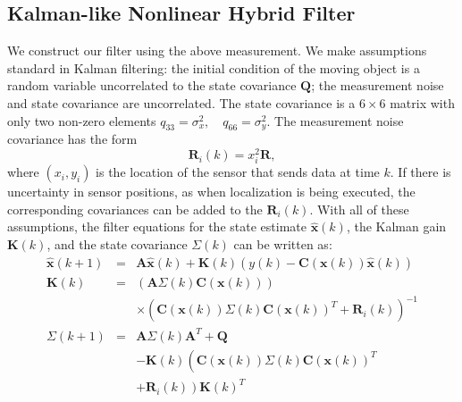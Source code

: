 \subsection{Kalman-like Nonlinear Hybrid Filter}
We construct our filter using the above measurement. We make assumptions standard in Kalman filtering: the initial condition of the moving object is a random variable uncorrelated to the state covariance $\mathbf{Q}$;  the measurement noise and state covariance are uncorrelated. The state covariance is a $6 \times 6$ matrix with only two non-zero elements $q_{33}=\sigma_x^2,\quad q_{66}=\sigma_y^2$. The measurement noise covariance has the form
\begin{equation}\label{eqn:Rk}
    \mathbf{R}_i(k)=x_i^2\mathbf{R},
\end{equation}
where $(x_i,y_i)$ is the location of the sensor that sends data at time $k$. If there is uncertainty in sensor positions, as when localization is being executed, the corresponding covariances can be added to the $\mathbf{R}_i(k)$. With all of these assumptions, the filter equations for the state estimate $\mathbf{\hat{x}}(k)$, the Kalman gain $\mathbf{K}(k)$, and the state covariance ${\Sigma}(k)$ can be written as:
 \begin{eqnarray}
   \mathbf{\hat{x}}(k+1) &=& \mathbf{A}\mathbf{\hat{x}}(k)+ \mathbf{K}(k)\left(y(k)-\mathbf{C}\left(\mathbf{x}(k)\right)\mathbf{\hat{x}}(k)\right)\label{eqn:Kalman-likeFilter}\\
   \mathbf{K}(k) &=& \left(\mathbf{A}{\Sigma}(k)\mathbf{C}\left(\mathbf{x}(k)\right)\right)\nonumber\\
   &&\times\left(\mathbf{C}\left(\mathbf{x}(k)\right){\Sigma}(k)\mathbf{C}\left(\mathbf{x}(k)\right)^T+\mathbf{R}_i(k)\right)^{-1} \label{eqn:FilterGainUpdate}\\
   {\Sigma}(k+1)&=& \mathbf{A}{\Sigma}(k)\mathbf{A}^T+\mathbf{Q}\nonumber\\
   &&-\mathbf{K}(k)\left(\mathbf{C}\left(\mathbf{x}(k)\right){\Sigma}(k)\mathbf{C}\left(\mathbf{x}(k)\right)^T\right.\nonumber\\
   &&\left.+\mathbf{R}_i(k)\right)\mathbf{K}(k)^T \label{eqn:FilterCovUpdate}
 \end{eqnarray}
